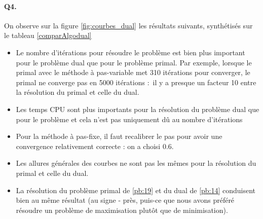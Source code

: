 \documentclass{article}
\begin{document}
        \paragraph{Q4.} On observe sur la figure \ref{fig:courbes_dual} les résultats suivants, synthétisés sur le tableau \ref{comparAlgodual}
        \begin{itemize}
            \item Le nombre d'itérations pour résoudre le problème est bien plus important pour le problème dual que pour le problème primal. Par exemple, lorsque le primal avec le méthode à pas-variable met 310 itérations pour converger, le primal ne converge pas en 5000 itérations : il y a presque un facteur 10 entre la résolution du primal et celle du dual.
            \item Les temps CPU sont plus importants pour la résolution du problème dual que pour le problème et cela n'est pas uniquement dû au nombre d'itérations
            \item Pour la méthode à pas-fixe, il faut recalibrer le pas pour avoir une convergence relativement correcte : on a choisi 0.6.
            \item Les allures générales des courbes ne sont pas les mêmes pour la résolution du primal et celle du dual.
            \item La résolution du problème primal de \ref{pb:19} et du dual de \ref{pb:14} conduisent bien au même résultat (au signe - près, puis-ce que nous avons préféré résoudre un problème de maximisation plutôt que de minimisation).
        \end{itemize}
\end{document}
